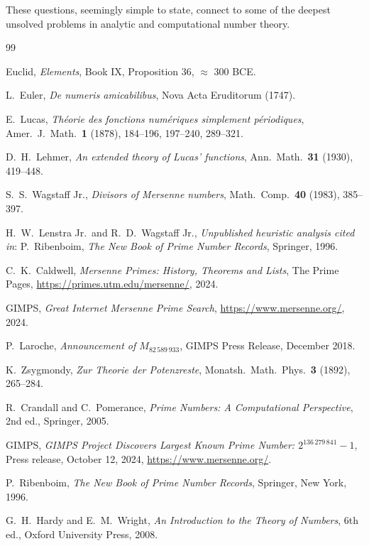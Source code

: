 \documentclass[12pt,a4paper]{amsart}
\theoremstyle{definition}
\theoremstyle{remark}
\begin{document}
These questions, seemingly simple to state, connect to some of the deepest
unsolved problems in analytic and computational number theory.

\begin{thebibliography}{99}

Euclid,
\textit{Elements},
Book IX, Proposition 36, $\approx$ 300 BCE.

L.\ Euler,
\textit{De numeris amicabilibus},
Nova Acta Eruditorum (1747).

E.\ Lucas,
\textit{Théorie des fonctions numériques simplement périodiques},
Amer.\ J.\ Math.\ \textbf{1} (1878), 184--196, 197--240, 289--321.

D.\ H.\ Lehmer,
\textit{An extended theory of Lucas' functions},
Ann.\ Math.\ \textbf{31} (1930), 419--448.

S.\ S.\ Wagstaff Jr.,
\textit{Divisors of Mersenne numbers},
Math.\ Comp.\ \textbf{40} (1983), 385--397.

H.\ W.\ Lenstra Jr.\ and R.\ D.\ Wagstaff Jr.,
\textit{Unpublished heuristic analysis cited in}:
P.\ Ribenboim, \textit{The New Book of Prime Number Records},
Springer, 1996.

C.\ K.\ Caldwell,
\textit{Mersenne Primes: History, Theorems and Lists},
The Prime Pages, \url{https://primes.utm.edu/mersenne/}, 2024.

GIMPS,
\textit{Great Internet Mersenne Prime Search},
\url{https://www.mersenne.org/}, 2024.

P.\ Laroche,
\textit{Announcement of $M_{82\,589\,933}$},
GIMPS Press Release, December 2018.

K.\ Zsygmondy,
\textit{Zur Theorie der Potenzreste},
Monatsh.\ Math.\ Phys.\ \textbf{3} (1892), 265--284.

R.\ Crandall and C.\ Pomerance,
\textit{Prime Numbers: A Computational Perspective},
2nd ed., Springer, 2005.

GIMPS,
\textit{GIMPS Project Discovers Largest Known Prime Number: $2^{136\,279\,841}-1$},
Press release, October 12, 2024,
\url{https://www.mersenne.org/}.

P.\ Ribenboim,
\textit{The New Book of Prime Number Records},
Springer, New York, 1996.

G.\ H.\ Hardy and E.\ M.\ Wright,
\textit{An Introduction to the Theory of Numbers},
6th ed., Oxford University Press, 2008.

\end{thebibliography}
\end{document}
